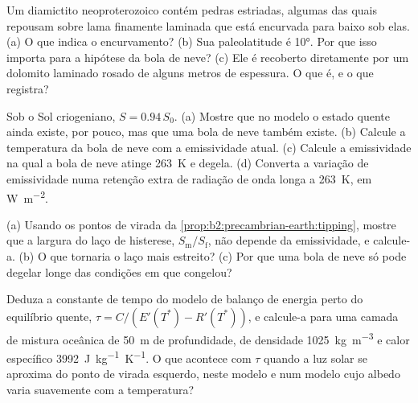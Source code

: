 \begin{exercise}[$\star\star$]\label{exo:b2:precambrian-earth:9}
Um diamictito neoproterozoico contém pedras estriadas, algumas das quais repousam sobre lama finamente laminada
que está encurvada para baixo sob elas. (a) O que indica o encurvamento? (b) Sua paleolatitude é
\ang{10}. Por que isso importa para a hipótese da bola de neve? (c) Ele é recoberto diretamente por um
dolomito laminado rosado de alguns metros de espessura. O que é, e o que registra?
\end{exercise}

\begin{exercise}[$\star\star\star$]\label{exo:b2:precambrian-earth:10}
Sob o Sol criogeniano, $S = 0.94\,S_0$. (a) Mostre que no modelo o estado quente ainda
existe, por pouco, mas que uma bola de neve também existe. (b) Calcule a temperatura da bola de neve com
a emissividade atual. (c) Calcule a emissividade na qual a bola de neve atinge \qty{263}{K} e
degela. (d) Converta a variação de emissividade numa retenção extra de radiação de onda longa a
\qty{263}{K}, em \unit{W.m^{-2}}.
\end{exercise}

\begin{exercise}[$\star\star\star$]\label{exo:b2:precambrian-earth:11}
(a) Usando os pontos de virada da \cref{prop:b2:precambrian-earth:tipping}, mostre que a largura
do laço de histerese, $S_{\text{m}}/S_{\text{f}}$, não depende da emissividade, e
calcule-a. (b) O que tornaria o laço mais estreito? (c) Por que uma bola de neve só pode degelar longe
das condições em que congelou?
\end{exercise}

\begin{exercise}[$\star\star\star$]\label{exo:b2:precambrian-earth:12}
Deduza a constante de tempo do modelo de balanço de energia perto do equilíbrio quente, $\tau =
C/(E'(T^*) - R'(T^*))$, e calcule-a para uma camada de mistura oceânica de \qty{50}{m} de profundidade, de densidade
\qty{1025}{kg.m^{-3}} e calor específico \qty{3992}{J.kg^{-1}.K^{-1}}. O que acontece com $\tau$ quando a
luz solar se aproxima do ponto de virada esquerdo, neste modelo e num modelo cujo albedo varia
suavemente com a temperatura?
\end{exercise}

